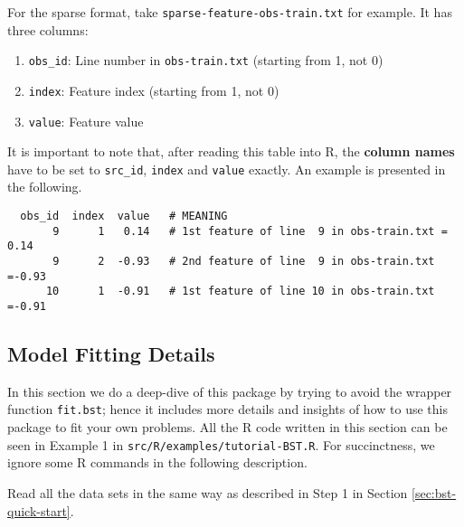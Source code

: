 \documentclass[10pt]{article}
\newcommand{\parahead}[1]{\vspace{0.15in}\noindent{\bf #1:}}
\begin{document}
For the sparse format, take {\tt sparse-feature-obs-train.txt} for example.  It has three columns:
\begin{enumerate}
\item {\tt obs\_id}: Line number in {\tt obs-train.txt} (starting from 1, not 0)
\item {\tt index}: Feature index (starting from 1, not 0)
\item {\tt value}: Feature value
\end{enumerate}
It is important to note that, after reading this table into R, the {\bf column names} have to be set to {\tt src\_id}, {\tt index} and {\tt value} exactly.  An example is presented in the following.
{\small\begin{verbatim}
  obs_id  index  value   # MEANING
       9      1   0.14   # 1st feature of line  9 in obs-train.txt = 0.14
       9      2  -0.93   # 2nd feature of line  9 in obs-train.txt =-0.93
      10      1  -0.91   # 1st feature of line 10 in obs-train.txt =-0.91
\end{verbatim}}



\subsection{Model Fitting Details}
\label{sec:fitting}
In this section we do a deep-dive of this package by trying to avoid the wrapper function {\tt fit.bst}; hence it includes more details and insights of how to use this package to fit your own problems. All the R code written in this section can be 
seen in Example 1 in {\tt src/R/examples/tutorial-BST.R}.  For succinctness, we ignore some R commands in the following description.

\parahead{Step 1} Read all the data sets in the same way as described in Step 1 in Section \ref{sec:bst-quick-start}.
\end{document}
